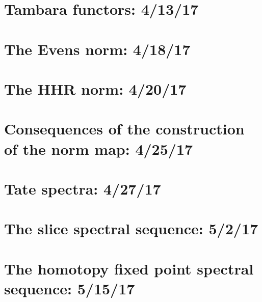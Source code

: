 \documentclass{style_EHT}
\begin{document}
\section{Tambara functors: 4/13/17}
	
\section{The Evens norm: 4/18/17}
	
\section{The HHR norm: 4/20/17}
	
\section{Consequences of the construction of the norm map: 4/25/17}
	
\section{Tate spectra: 4/27/17}
	
\section{The slice spectral sequence: 5/2/17}
	
\section{The homotopy fixed point spectral sequence: 5/15/17}
	

{}

\end{document}
